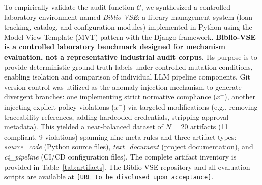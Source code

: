 \documentclass{ieeeaccess}
\begin{document}
To empirically validate the audit function $\mathcal{C}$, we synthesized a controlled laboratory environment named \textit{Biblio-VSE}: a library management system (loan tracking, catalog, and configuration modules) implemented in Python using the Model-View-Template (MVT) pattern with the Django framework. \textbf{Biblio-VSE is a controlled laboratory benchmark designed for mechanism evaluation, not a representative industrial audit corpus.} Its purpose is to provide deterministic ground-truth labels under controlled mutation conditions, enabling isolation and comparison of individual LLM pipeline components. Git version control was utilized as the anomaly injection mechanism to generate divergent branches: one implementing strict normative compliance ($x^+$), another injecting explicit policy violations ($x^-$) via targeted modifications (e.g., removing traceability references, adding hardcoded credentials, stripping approval metadata). This yielded a near-balanced dataset of $N=20$ artifacts (11 compliant, 9 violations) spanning nine meta-rules and three artifact types: \textit{source\_code} (Python source files), \textit{text\_document} (project documentation), and \textit{ci\_pipeline} (CI/CD configuration files). The complete artifact inventory is provided in Table~\ref{tab:artifacts}. The Biblio-VSE repository and all evaluation scripts are available at \texttt{[URL to be disclosed upon acceptance]}.
\end{document}
